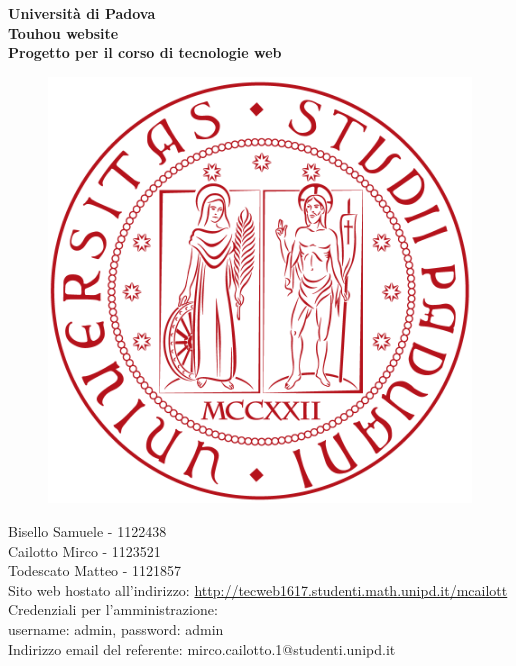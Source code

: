 \documentclass[openany, a4paper, 12pt]{report}
\begin{document}
	\begin{titlepage}
		\centering
		\vfill
		{
			\bfseries
			\vskip2cm
			\Large Università di Padova\\
			\vfill
			\Huge Touhou website\\
			\Large Progetto per il corso di tecnologie web\\
			\vfill
			
			\begin{figure}[H]
				\centering
				\includegraphics[width=0.6\linewidth]{images/LogoPadova}
			\end{figure}
			\large Bisello Samuele - 1122438 \\ Cailotto Mirco - 1123521 \\ Todescato Matteo - 1121857 \\
			\vfill
			Sito web hostato all'indirizzo: \url{http://tecweb1617.studenti.math.unipd.it/mcailott}\\
			{\small Credenziali per l'amministrazione:\\username: admin, password: admin\\}
			\vfill
			Indirizzo email del referente: mirco.cailotto.1@studenti.unipd.it\\
			\vfill
		}
	\end{titlepage}
	\tableofcontents
	\newpage

\end{document}
